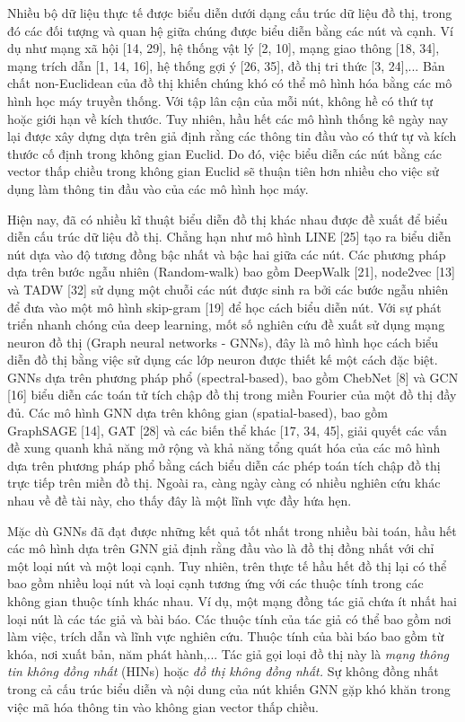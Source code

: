  Nhiều bộ dữ liệu thực tế được biểu diễn dưới dạng cấu trúc dữ liệu đồ thị, trong đó các đối tượng và quan hệ giữa chúng được biểu diễn bằng các nút và cạnh. Ví dụ như mạng xã hội [14, 29], hệ thống vật lý [2, 10], mạng giao thông [18, 34], mạng trích dẫn [1, 14, 16], hệ thống gợi ý [26, 35], đồ thị tri thức [3, 24],... Bản chất non-Euclidean của đồ thị khiến chúng khó có thể mô hình hóa bằng các mô hình học máy truyền thống. Với tập lân cận của mỗi nút, không hề có thứ tự hoặc giới hạn về kích thước. Tuy nhiên, hầu hết các mô hình thống kê ngày nay lại được xây dựng dựa trên giả định rằng các thông tin đầu vào có thứ tự và kích thước cố định trong không gian Euclid. Do đó, việc biểu diễn các nút bằng các vector thấp chiều trong không gian Euclid sẽ thuận tiên hơn nhiều cho việc sử dụng làm thông tin đầu vào của các mô hình học máy. 

 Hiện nay, đã có nhiều kĩ thuật biểu diễn đồ thị khác nhau được đề xuất để biểu diễn cấu trúc dữ liệu đồ thị. Chẳng hạn như mô hình LINE [25] tạo ra biểu diễn nút dựa vào độ tương đồng bậc nhất và bậc hai giữa các nút. Các phương pháp dựa trên bước ngẫu nhiên (Random-walk) bao gồm DeepWalk [21], node2vec [13] và TADW [32] sử dụng một chuỗi các nút được sinh ra bởi các bước ngẫu nhiên để đưa vào một mô hình skip-gram [19] để học cách biểu diễn nút. Với sự phát triển nhanh chóng của deep learning, mốt số nghiên cứu đề xuất sử dụng mạng neuron đồ thị (Graph neural networks - GNNs), đây là mô hình học cách biểu diễn đồ thị bằng việc sử dụng các lớp neuron được thiết kế một cách đặc biệt. GNNs dựa trên phương pháp phổ (spectral-based), bao gồm ChebNet [8] và GCN [16] biểu diễn các toán tử tích chập đồ thị trong miền Fourier của một đồ thị đầy đủ. Các mô hình GNN dựa trên không gian (spatial-based), bao gồm GraphSAGE [14], GAT [28] và các biến thể khác [17, 34, 45], giải quyết các vấn đề xung quanh khả năng mở rộng và khả năng tổng quát hóa của các mô hình dựa trên phương pháp phổ bằng cách biểu diễn các phép toán tích chập đồ thị trực tiếp trên miền đồ thị. Ngoài ra, càng ngày càng có nhiều nghiên cứu khác nhau về đề tài này, cho thấy đây là một lĩnh vực đầy hứa hẹn.

 Mặc dù GNNs đã đạt được những kết quả tốt nhất trong nhiều bài toán, hầu hết các mô hình dựa trên GNN giả định rằng đầu vào là đồ thị đồng nhất với chỉ một loại nút và một loại cạnh. Tuy nhiên, trên thực tế hầu hết đồ thị lại có thể bao gồm nhiều loại nút và loại cạnh tương ứng với các thuộc tính trong các không gian thuộc tính khác nhau. Ví dụ, một mạng đồng tác giả chứa ít nhất hai loại nút là các tác giả và bài báo. Các thuộc tính của tác giả có thể bao gồm nơi làm việc, trích dẫn và lĩnh vực nghiên cứu. Thuộc tính của bài báo bao gồm từ khóa, nơi xuất bản, năm phát hành,... Tác giả gọi loại đồ thị này là \textit{mạng thông tin không đồng nhất} (HINs) hoặc \textit{đồ thị không đồng nhất.}
 Sự không đồng nhất trong cả cấu trúc biểu diễn và nội dung của nút khiến GNN gặp khó khăn trong việc mã hóa thông tin vào không gian vector thấp chiều. 

